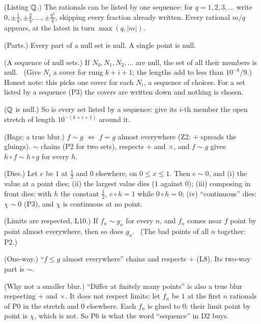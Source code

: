 \begin{lines}
\item[\lab{P0}] (Listing $\mathbb{Q}$.) The rationals can be listed by one sequence: for $q = 1, 2, 3, \dots$ write $0, \pm\tfrac{1}{q}, \pm\tfrac{2}{q}, \dots, \pm\tfrac{q^2}{q}$, skipping every fraction already written. Every rational $m/q$ appears, at the latest in turn $\max(q, |m|)$.
\item[\lab{P1}] (Parts.) Every part of a null set is null. A single point is null.
\item[\lab{P2}] (A sequence of null sets.) If $N_0, N_1, N_2, \dots$ are null, the set of all their members is null. \ (Give $N_i$ a cover for rung $k + i + 1$; the lengths add to less than $10^{-k}/9$.) \\
Honest note: this picks one cover for each $N_i$, a sequence of choices. For a set listed by a sequence (P3) the covers are written down and nothing is chosen.
\item[\lab{P3}] ($\mathbb{Q}$ is null.) So is every set listed by a sequence: give its $i$-th member the open stretch of length $10^{-(k+i+1)}$ around it.
\item[\lab{P4}] (Bags; a true blur.) $f \sim g$ $\iff$ $f = g$ almost everywhere (Z2: $+$ spreads the gluings). $\sim$ chains (P2 for two sets), respects $+$ and $\times$, and $f \sim g$ gives $h \circ f \sim h \circ g$ for every $h$.
\item[\lab{P5}] (Dies.) Let $e$ be $1$ at $\tfrac12$ and $0$ elsewhere, on $0 \le x \le 1$. Then $e \sim 0$, and
  (i) the value at a point dies;
  (ii) the largest value dies ($1$ against $0$);
  (iii) composing in front dies: with $h$ the constant $\tfrac12$, $e \circ h = 1$ while $0 \circ h = 0$;
  (iv) ``continuous'' dies: $\chi \sim 0$ (P3), and $\chi$ is continuous at no point.
\item[\lab{P6}] (Limits are respected, L10.) If $f_n \sim g_n$ for every $n$, and $f_n$ comes near $f$ point by point almost everywhere, then so does $g_n$. \ (The bad points of all $n$ together: P2.)
\item[\lab{P7}] (One-way.) ``$f \le g$ almost everywhere'' chains and respects $+$ (L8). Its two-way part is $\sim$.
\item[\lab{P8}] (Why not a smaller blur.) ``Differ at finitely many points'' is also a true blur respecting $+$ and $\times$. It does not respect limits: let $f_n$ be $1$ at the first $n$ rationals of P0 in the stretch and $0$ elsewhere. Each $f_n$ is glued to $0$; their limit point by point is $\chi$, which is not. So P6 is what the word ``sequence'' in D2 buys.
\end{lines}


